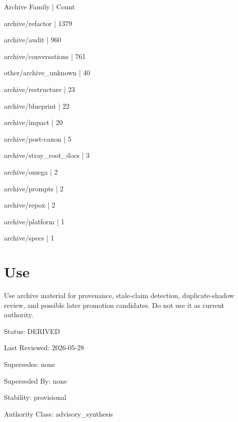 \documentclass[11pt,a4paper]{report}
\begin{document}
{\small\ttfamily\raggedright Archive Family | Count\par}
{\small\ttfamily\raggedright archive/\allowbreak{}refactor | 1379\par}
{\small\ttfamily\raggedright archive/\allowbreak{}audit | 960\par}
{\small\ttfamily\raggedright archive/\allowbreak{}conversations | 761\par}
{\small\ttfamily\raggedright other/\allowbreak{}archive\_unknown | 40\par}
{\small\ttfamily\raggedright archive/\allowbreak{}restructure | 23\par}
{\small\ttfamily\raggedright archive/\allowbreak{}blueprint | 22\par}
{\small\ttfamily\raggedright archive/\allowbreak{}impact | 20\par}
{\small\ttfamily\raggedright archive/\allowbreak{}post-\allowbreak{}canon | 5\par}
{\small\ttfamily\raggedright archive/\allowbreak{}stray\_root\_docs | 3\par}
{\small\ttfamily\raggedright archive/\allowbreak{}omega | 2\par}
{\small\ttfamily\raggedright archive/\allowbreak{}prompts | 2\par}
{\small\ttfamily\raggedright archive/\allowbreak{}repox | 2\par}
{\small\ttfamily\raggedright archive/\allowbreak{}platform | 1\par}
{\small\ttfamily\raggedright archive/\allowbreak{}specs | 1\par}

\section{Use}

Use archive material for provenance, stale-\allowbreak{}claim detection, duplicate-\allowbreak{}shadow review, and possible later promotion candidates.\allowbreak{} Do not use it as current authority.\allowbreak{}



Status: DERIVED

Last Reviewed: 2026-\allowbreak{}05-\allowbreak{}28

Supersedes: none

Superseded By: none

Stability: provisional

Authority Class: advisory\_synthesis
\end{document}
